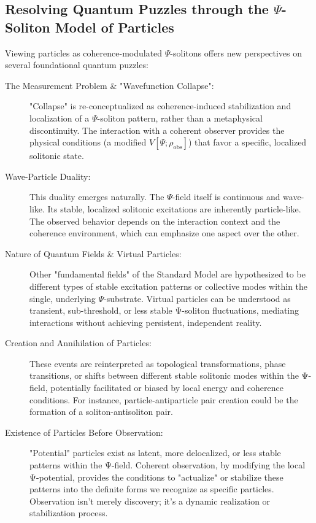 \documentclass[11pt, a4paper]{book}
\begin{document}
\subsection{Resolving Quantum Puzzles through the $\Psi$-Soliton Model of Particles}
\label{ssec:particles_resolvingpuzzles_mainpaper}
Viewing particles as coherence-modulated $\Psi$-solitons offers new perspectives on several foundational quantum puzzles:
\begin{description}
    \item[The Measurement Problem \& "Wavefunction Collapse":] "Collapse" is re-conceptualized as coherence-induced stabilization and localization of a $\Psi$-soliton pattern, rather than a metaphysical discontinuity. The interaction with a coherent observer provides the physical conditions (a modified $V[\Psi; \rho_{\text{obs}}]$) that favor a specific, localized solitonic state.
    \item[Wave-Particle Duality:] This duality emerges naturally. The $\Psi$-field itself is continuous and wave-like. Its stable, localized solitonic excitations are inherently particle-like. The observed behavior depends on the interaction context and the coherence environment, which can emphasize one aspect over the other.
    \item[Nature of Quantum Fields & Virtual Particles:] Other "fundamental fields" of the Standard Model are hypothesized to be different types of stable excitation patterns or collective modes within the single, underlying $\Psi$-substrate. Virtual particles can be understood as transient, sub-threshold, or less stable Ψ-soliton fluctuations, mediating interactions without achieving persistent, independent reality.
    \item[Creation and Annihilation of Particles:] These events are reinterpreted as topological transformations, phase transitions, or shifts between different stable solitonic modes within the Ψ-field, potentially facilitated or biased by local energy and coherence conditions. For instance, particle-antiparticle pair creation could be the formation of a soliton-antisoliton pair.
    \item[Existence of Particles Before Observation:] "Potential" particles exist as latent, more delocalized, or less stable patterns within the Ψ-field. Coherent observation, by modifying the local Ψ-potential, provides the conditions to "actualize" or stabilize these patterns into the definite forms we recognize as specific particles. Observation isn’t merely discovery; it’s a dynamic realization or stabilization process.
\end{description}
\end{document}
